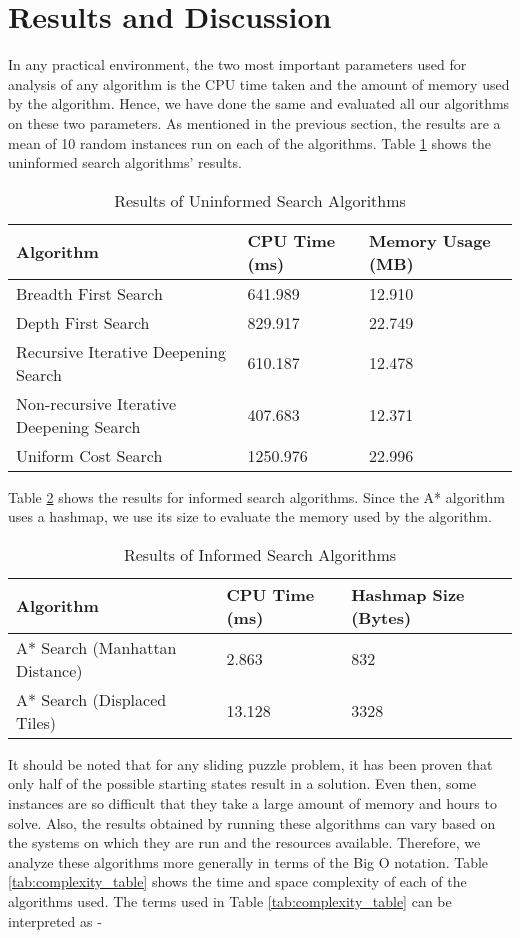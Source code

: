 \documentclass[12pt]{article}
\begin{document}
\section{Results and Discussion}
In any practical environment, the two most important parameters used for analysis of any algorithm is the CPU time taken and the amount of memory used by the algorithm. Hence, we have done the same and evaluated all our algorithms on these two parameters. As mentioned in the previous section, the results are a mean of 10 random instances run on each of the algorithms. Table \ref{tab:timing-uis} shows the uninformed search algorithms' results.
\begin{table}[h]
    \centering
    \begin{tabular}{|p{2.5in}|p{1in}|p{1in}|}
        \hline
        \textbf{Algorithm} & \textbf{CPU Time (ms)} & \textbf{Memory Usage (MB)} \\
        \hline
        Breadth First Search & 641.989 & 12.910 \\
        Depth First Search & 829.917 & 22.749 \\
        Recursive Iterative Deepening Search & 610.187 & 12.478 \\
        Non-recursive Iterative Deepening Search & 407.683 & 12.371 \\
        Uniform Cost Search & 1250.976 & 22.996 \\
        \hline
    \end{tabular}
    \caption{Results of Uninformed Search Algorithms}
    \label{tab:timing-uis}
\end{table}
Table \ref{tab:timing-is} shows the results for informed search algorithms. Since the A* algorithm uses a hashmap, we use its size to evaluate the memory used by the algorithm. \\
\begin{table}[h]
    \centering
    \begin{tabular}{|p{2.5in}|p{1in}|p{1in}|}
        \hline
        \textbf{Algorithm} & \textbf{CPU Time (ms)} & \textbf{Hashmap Size (Bytes)} \\
        \hline
        A* Search (Manhattan Distance) & 2.863 & 832 \\
        A* Search (Displaced Tiles) & 13.128 & 3328 \\
        \hline
    \end{tabular}
    \caption{Results of Informed Search Algorithms}
    \label{tab:timing-is}
\end{table}
It should be noted that for any sliding puzzle problem, it has been proven that only half of the possible starting states result in a solution. Even then, some instances are so difficult that they take a large amount of memory and hours to solve. Also, the results obtained by running these algorithms can vary based on the systems on which they are run and the resources available. Therefore, we analyze these algorithms more generally in terms of the Big O notation. Table \ref{tab:complexity_table} shows the time and space complexity of each of the algorithms used. The terms used in Table \ref{tab:complexity_table} can be interpreted as - \\
\end{document}
